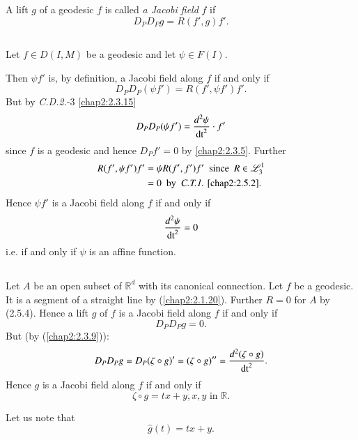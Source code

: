 \begin{defi*}
A lift $g$ of a geodesic $f$ is called {\em a Jacobi field} $f$ if
$$
D_{P}D_{P}g=R(f',g)f'.
$$
\end{defi*}

\subsection{}\label{chap2:2.8.10}

\begin{examples*}
Let $f\in D(I,M)$ be a geodesic and let $\psi\in F(I)$.

Then $\psi f'$ is, by definition, a Jacobi field along $f$ if and only
if
$$
D_{P}D_{P}(\psi f')=R(f',\psi f')f'.
$$
But by {\em C.D.2.}-3 \eqref{chap2:2.3.15}
$$
D_{P}D_{P}(\psi f')=\frac{d^{2}\psi}{\operatorname{dt}^{2}}\cdot f'
$$ 
since $f$ is a geodesic and hence $D_{P}f'=0$ by
\ref{chap2:2.3.5}. Further 
\begin{align*}
R(f',\psi f')f' &= \psi R(f',f')f'\text{ \ since \ } R\in
\mathscr{L}^{1}_{3}\\
&= 0\text{ \ by \ {\em C.T.1.} \ref{chap2:2.5.2}.}
\end{align*}
Hence \pageoriginale $\psi f'$ is a Jacobi field along $f$ if and only  
if
$$
\frac{d^{2}\psi}{\operatorname{dt}^{2}}=0
$$
i.e. if and only if $\psi$ is an affine function.
\end{examples*}

\setcounter{subsection}{10}
\subsection{}\label{chap2:2.8.11}
Let $A$ be an open subset of $\mathbb{R}^{d}$ with its canonical
connection. Let $f$ be a geodesic. It is a segment of a straight line
by  (\ref{chap2:2.1.20}). Further $R=0$ for $A$ by (2.5.4). Hence a lift $g$
of $f$ is a Jacobi field along $f$ if and only if
$$
D_{P}D_{P}g=0.
$$
But (by (\ref{chap2:2.3.9})):
$$
D_{P}D_{P}g=D_{P}(\zeta\circ g)'=(\zeta\circ
g)''=\frac{d^{2}(\zeta\circ g)}{\operatorname{dt}^{2}}.
$$
Hence $g$ is a Jacobi field along $f$ if and only if
\begin{equation*}
\zeta\circ g=tx+y, x, y\text{ \ in
  \ }\mathbb{R}.\tag{2.8.12}\label{chap2:2.8.12} 
\end{equation*}

Let us note that
\begin{equation*}
\widehat{g}(t)=tx+y.\tag{2.8.13}\label{chap2:2.8.13}
\end{equation*}

